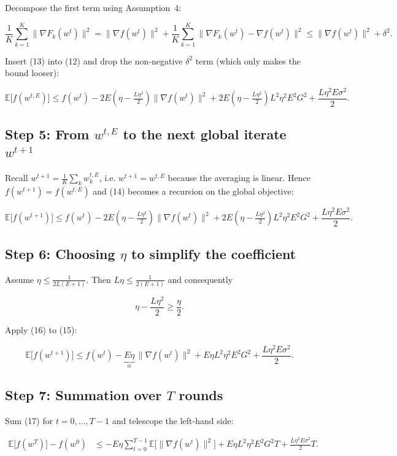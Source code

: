 \documentclass{article}
\newcommand{\E}{\mathbb{E}}
\begin{document}
Decompose the first term using Assumption~4:

\[
\frac{1}{K}\sum_{k=1}^{K}\|\nabla F_k(w^{t})\|^{2}
= \|\nabla f(w^{t})\|^{2}
+ \frac{1}{K}\sum_{k=1}^{K}\|\nabla F_k(w^{t})-\nabla f(w^{t})\|^{2}
\le \|\nabla f(w^{t})\|^{2}+\delta^{2}.
\tag{13}
\]

Insert (13) into (12) and drop the non‑negative $\delta^{2}$ term (which only makes the bound looser):

\[
\E\big[f(w^{t,E})\big]\le
f(w^{t})-2E(\eta-\tfrac{L\eta^{2}}{2})\|\nabla f(w^{t})\|^{2}
+2E(\eta-\tfrac{L\eta^{2}}{2})L^{2}\eta^{2}E^{2}G^{2}
+\frac{L\eta^{2}E\sigma^{2}}{2}.
\tag{14}
\]

\subsection*{Step 5: From $w^{t,E}$ to the next global iterate $w^{t+1}$}
Recall $w^{t+1}= \frac{1}{K}\sum_{k} w^{t,E}_{k}$, i.e. $w^{t+1}=w^{t,E}$ because the averaging is linear. Hence $f(w^{t+1})=f(w^{t,E})$ and (14) becomes a recursion on the global objective:

\[
\E\big[f(w^{t+1})\big]\le
f(w^{t})-2E(\eta-\tfrac{L\eta^{2}}{2})\|\nabla f(w^{t})\|^{2}
+2E(\eta-\tfrac{L\eta^{2}}{2})L^{2}\eta^{2}E^{2}G^{2}
+\frac{L\eta^{2}E\sigma^{2}}{2}.
\tag{15}
\]

\subsection*{Step 6: Choosing $\eta$ to simplify the coefficient}
Assume $\eta\le \frac{1}{2L(E+1)}$. Then $L\eta\le\frac{1}{2(E+1)}$ and consequently  

\[
\eta-\frac{L\eta^{2}}{2}\ge \frac{\eta}{2}.
\tag{16}
\]

Apply (16) to (15):

\[
\E\big[f(w^{t+1})\big]\le
f(w^{t})-\underbrace{E\eta}_{\alpha}\,\|\nabla f(w^{t})\|^{2}
+E\eta L^{2}\eta^{2}E^{2}G^{2}
+\frac{L\eta^{2}E\sigma^{2}}{2}.
\tag{17}
\]

\subsection*{Step 7: Summation over $T$ rounds}
Sum (17) for $t=0,\dots,T-1$ and telescope the left‑hand side:

\[
\begin{aligned}
\E\big[f(w^{T})\big]-f(w^{0})
&\le
- E\eta\sum_{t=0}^{T-1}\E\!\big[\|\nabla f(w^{t})\|^{2}\big]
+E\eta L^{2}\eta^{2}E^{2}G^{2}T
+\frac{L\eta^{2}E\sigma^{2}}{2}T .
\end{aligned}
\tag{18}
\]
\end{document}
